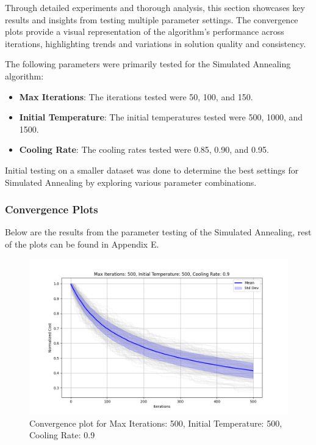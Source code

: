 \documentclass{article}
\begin{document}
    Through detailed experiments and thorough analysis, this section showcases key results and insights from testing multiple parameter settings.
    The convergence plots provide a visual representation of the algorithm’s performance across iterations, highlighting trends and variations in solution quality and consistency.

    The following parameters were primarily tested for the Simulated Annealing algorithm:

    \begin{itemize}
        \item \textbf{Max Iterations}: The iterations tested were 50, 100, and 150.
        \item \textbf{Initial Temperature}: The initial temperatures tested were 500, 1000, and 1500.
        \item \textbf{Cooling Rate}: The cooling rates tested were 0.85, 0.90, and 0.95.
    \end{itemize}

    Initial testing on a smaller dataset was done to determine the best settings for Simulated Annealing by exploring various parameter combinations.

    \subsubsection{Convergence Plots}
    Below are the results from the parameter testing of the Simulated Annealing, rest of the plots can be found in Appendix E.

    \begin{figure}[H]
        \centering
        \includegraphics[width=\textwidth]{simulated_annealing/max_iter_500_init_temp_500_cooling_rate_0.9}
        \caption{Convergence plot for Max Iterations: 500, Initial Temperature: 500, Cooling Rate: 0.9}
        \label{fig:sa_500_500_0.9}
    \end{figure}
\end{document}
